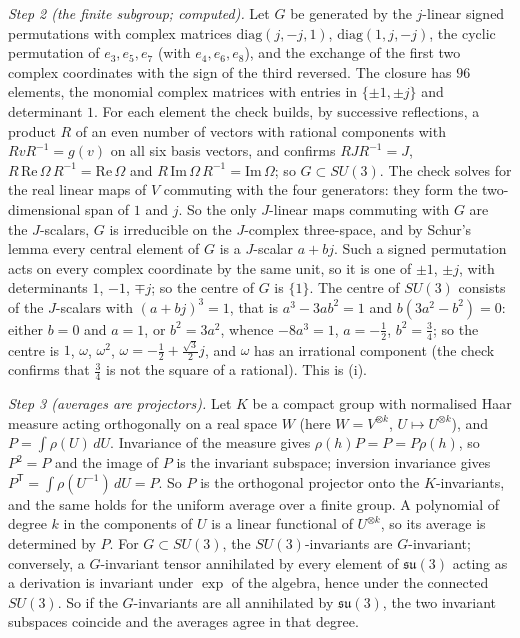 \emph{Step 2 (the finite subgroup; computed).} Let $G$ be generated by the $j$-linear signed permutations with complex matrices $\mathrm{diag}(j, -j, 1)$, $\mathrm{diag}(1, j, -j)$, the cyclic permutation of $e_{3}, e_{5}, e_{7}$ (with $e_{4}, e_{6}, e_{8}$), and the exchange of the first two complex coordinates with the sign of the third reversed. The closure has $96$ elements, the monomial complex matrices with entries in $\{\pm1, \pm j\}$ and determinant $1$. For each element the check builds, by successive reflections, a product $R$ of an even number of vectors with rational components with $RvR^{-1} = g(v)$ on all six basis vectors, and confirms $RJR^{-1} = J$, $R\,\mathrm{Re}\,\Omega\,R^{-1} = \mathrm{Re}\,\Omega$ and $R\,\mathrm{Im}\,\Omega\,R^{-1} = \mathrm{Im}\,\Omega$; so $G \subset SU(3)$. The check solves for the real linear maps of $V$ commuting with the four generators: they form the two-dimensional span of $1$ and $j$. So the only $J$-linear maps commuting with $G$ are the $J$-scalars, $G$ is irreducible on the $J$-complex three-space, and by Schur's lemma every central element of $G$ is a $J$-scalar $a + bj$. Such a signed permutation acts on every complex coordinate by the same unit, so it is one of $\pm1$, $\pm j$, with determinants $1$, $-1$, $\mp j$; so the centre of $G$ is $\{1\}$. The centre of $SU(3)$ consists of the $J$-scalars with $(a + bj)^{3} = 1$, that is $a^{3} - 3ab^{2} = 1$ and $b(3a^{2} - b^{2}) = 0$: either $b = 0$ and $a = 1$, or $b^{2} = 3a^{2}$, whence $-8a^{3} = 1$, $a = -\tfrac12$, $b^{2} = \tfrac34$; so the centre is $1$, $\omega$, $\omega^{2}$, $\omega = -\tfrac12 + \tfrac{\sqrt3}{2}j$, and $\omega$ has an irrational component (the check confirms that $\tfrac34$ is not the square of a rational). This is (i).

\emph{Step 3 (averages are projectors).} Let $K$ be a compact group with normalised Haar measure acting orthogonally on a real space $W$ (here $W = V^{\otimes k}$, $U \mapsto U^{\otimes k}$), and $P = \int\rho(U)\,dU$. Invariance of the measure gives $\rho(h)P = P = P\rho(h)$, so $P^{2} = P$ and the image of $P$ is the invariant subspace; inversion invariance gives $P^{\mathsf T} = \int\rho(U^{-1})\,dU = P$. So $P$ is the orthogonal projector onto the $K$-invariants, and the same holds for the uniform average over a finite group. A polynomial of degree $k$ in the components of $U$ is a linear functional of $U^{\otimes k}$, so its average is determined by $P$. For $G \subset SU(3)$, the $SU(3)$-invariants are $G$-invariant; conversely, a $G$-invariant tensor annihilated by every element of $\mathfrak{su}(3)$ acting as a derivation is invariant under $\exp$ of the algebra, hence under the connected $SU(3)$. So if the $G$-invariants are all annihilated by $\mathfrak{su}(3)$, the two invariant subspaces coincide and the averages agree in that degree.

